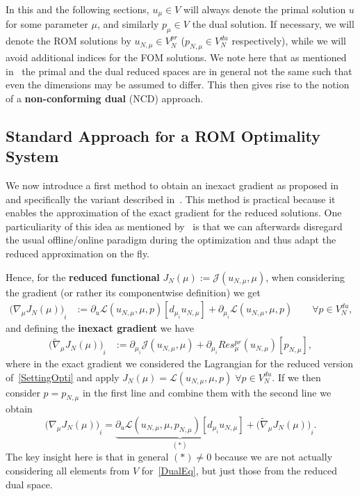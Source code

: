 In this and the following sections, $u_\mu \in V$ will always denote the primal solution $u$ for some parameter $\mu$, and similarly $p_\mu \in V$ the dual solution.
If necessary, we will denote the ROM solutions by $u_{N, \mu} \in V_N^{pr}$ ($p_{N, \mu} \in V_N^{du}$ respectively), while we will avoid additional indices for the FOM solutions.
We note here that as mentioned in~\cite[Subsection 3.2]{Keil2021} the primal and the dual reduced spaces are in general not the same such that even the dimensions may be assumed to differ.
This then gives rise to the notion of a \textbf{non-conforming dual} (NCD) approach.

\subsection{Standard Approach for a ROM Optimality System}

We now introduce a first method to obtain an inexact gradient as proposed in~\cite{Qian2017} and specifically the variant described in~\cite[Subsection 3.2]{Keil2021}.
This method is practical because it enables the approximation of the exact gradient for the reduced solutions.
One particuliarity of this idea as mentioned by~\cite{Qian2017} is that we can afterwards disregard the usual offline/online paradigm during the optimization and thus adapt the reduced approximation on the fly.

Hence, for the \textbf{reduced functional} $J_N(\mu) := \mathcal{J}(u_{N, \mu}, \mu)$, when considering the gradient (or rather its componentwise definition) we get
\begin{align}\label{Grad}
    {\big( \nabla_\mu J_N(\mu) \big)}_i &:= \partial_u \mathcal{L}(u_{N, \mu}, \mu, p)[d_{\mu_i} u_{N, \mu}] + \partial_{\mu_i} \mathcal{L}(u_{N, \mu}, \mu, p) \qquad \forall p \in V_N^{du}, \tag*{(exact)}
\end{align}
and defining the \textbf{inexact gradient} we have
\begin{align}
    {\big( \tilde{\nabla}_\mu J_N(\mu) \big)}_i &:= \partial_{\mu_i} \mathcal{J}(u_{N, \mu}, \mu) + \partial_{\mu_i} Res_\mu^{pr}(u_{N, \mu})[p_{N, \mu}], \tag*{(inexact)}
\end{align}
where in the exact gradient we considered the Lagrangian for the reduced version of~\eqref{SettingOpti} and apply $J_N(\mu) = \mathcal{L}(u_{N, \mu}, \mu, p) \; \forall p \in V_N^{du}$.
If we then consider $p = p_{N, \mu}$ in the first line and combine them with the second line we obtain
\begin{equation*}\label{RelationGrads}
    {\big( \nabla_\mu J_N(\mu) \big)}_i = \underbrace{\partial_u \mathcal{L}(u_{N, \mu}, \mu, p_{N, \mu})[d_{\mu_i} u_{N, \mu}]}_{(\ast)} + {\big( \tilde{\nabla}_\mu J_N(\mu) \big)}_i.
\end{equation*}
The key insight here is that in general $(\ast) \neq 0$ because we are not actually considering all elements from $V$ for~\eqref{DualEq}, but just those from the reduced dual space.


